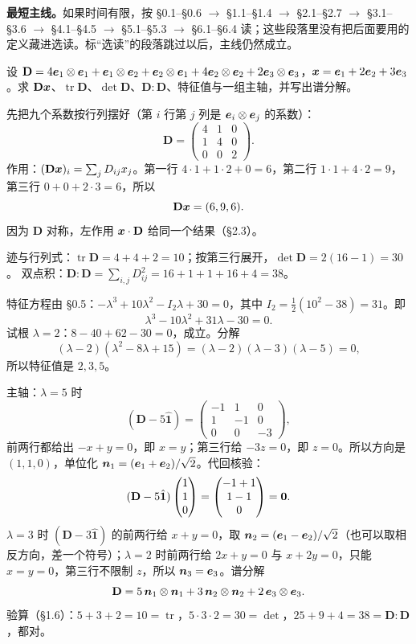\documentclass[11pt]{ctexart}
\newcommand{\ten}[1]{\mathbf{#1}}
\newcommand{\unitd}{\hat{\ten{1}}}
\newcommand{\tr}{\operatorname{tr}}
\let\orighdr\hdr
\renewcommand{\hdr}[2]{\par\needspace{10\baselineskip}\orighdr{#1}{#2}}
\begin{document}
\textbf{最短主线。}如果时间有限，按 \S0.1--\S0.6 $\to$ \S1.1--\S1.4 $\to$ \S2.1--\S2.7 $\to$ \S3.1--\S3.6 $\to$ \S4.1--\S4.5 $\to$ \S5.1--\S5.3 $\to$ \S6.1--\S6.4 读；这些段落里没有把后面要用的定义藏进选读。标“选读”的段落跳过以后，主线仍然成立。

\clearpage
\appendix
{}
\label{app:solutions}

{设 $\ten D=4\vect e_1\otimes\vect e_1+\vect e_1\otimes\vect e_2+\vect e_2\otimes\vect e_1+4\vect e_2\otimes\vect e_2+2\vect e_3\otimes\vect e_3$，$\boldsymbol{x}=\boldsymbol{e}_1+2\boldsymbol{e}_2+3\boldsymbol{e}_3$。求 $\ten D\vect x$、$\tr\ten D$、$\det\ten D$、$\ten D:\ten D$、特征值与一组主轴，并写出谱分解。}

先把九个系数按行列摆好（第 $i$ 行第 $j$ 列是 $\boldsymbol{e}_i\otimes\boldsymbol{e}_j$ 的系数）：
\[
\ten D=\begin{pmatrix}4&1&0\\1&4&0\\0&0&2\end{pmatrix}.
\]
作用：$(\ten D\vect x)_i=\sum_jD_{ij}x_j$。第一行 $4\cdot1+1\cdot2+0=6$，第二行 $1\cdot1+4\cdot2=9$，第三行 $0+0+2\cdot3=6$，所以
\[
\ten D\vect x=(6,9,6).
\]
因为 $\ten D$ 对称，左作用 $\vect x\cdot\ten D$ 给同一个结果（\S2.3）。

迹与行列式：$\tr\ten D=4+4+2=10$；按第三行展开，$\det\ten D=2(16-1)=30$。
双点积：$\ten D:\ten D=\sum_{i,j}D_{ij}^2=16+1+1+16+4=38$。

特征方程由 \S0.5：$-\lambda^3+10\lambda^2-I_2\lambda+30=0$，其中 $I_2=\frac12(10^2-38)=31$。即
\[
\lambda^3-10\lambda^2+31\lambda-30=0 .
\]
试根 $\lambda=2$：$8-40+62-30=0$，成立。分解
\[
(\lambda-2)(\lambda^2-8\lambda+15)=(\lambda-2)(\lambda-3)(\lambda-5)=0,
\]
所以特征值是 $2,3,5$。

主轴：$\lambda=5$ 时
\[
(\ten D-5\unitd)=\begin{pmatrix}-1&1&0\\1&-1&0\\0&0&-3\end{pmatrix},
\]
前两行都给出 $-x+y=0$，即 $x=y$；第三行给 $-3z=0$，即 $z=0$。所以方向是 $(1,1,0)$，单位化 $\boldsymbol{n}_1=(\boldsymbol{e}_1+\boldsymbol{e}_2)/\sqrt2$。代回核验：
\[
(\ten D-5\unitd)\begin{pmatrix}1\\1\\0\end{pmatrix}
=\begin{pmatrix}-1+1\\1-1\\0\end{pmatrix}=\vect0 .
\]
$\lambda=3$ 时 $(\ten D-3\unitd)$ 的前两行给 $x+y=0$，取 $\boldsymbol{n}_2=(\boldsymbol{e}_1-\boldsymbol{e}_2)/\sqrt2$（也可以取相反方向，差一个符号）；$\lambda=2$ 时前两行给 $2x+y=0$ 与 $x+2y=0$，只能 $x=y=0$，第三行不限制 $z$，所以 $\boldsymbol{n}_3=\boldsymbol{e}_3$。谱分解
\[
\ten D=5\,\vect n_1\otimes\vect n_1+3\,\vect n_2\otimes\vect n_2+2\,\vect e_3\otimes\vect e_3 .
\]
验算（\S1.6）：$5+3+2=10=\tr$，$5\cdot3\cdot2=30=\det$，$25+9+4=38=\ten D:\ten D$，都对。
\end{document}
